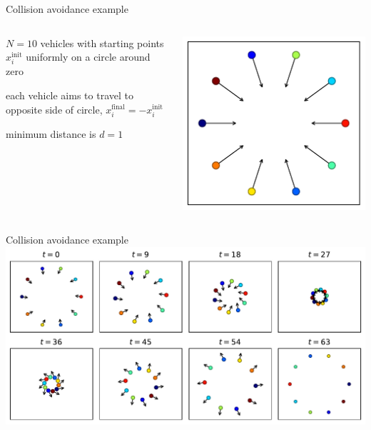 \documentclass[aspectratio=169,11pt]{beamer}
\begin{document}
\begin{frame}{Collision avoidance example}
\begin{columns}
\begin{column}{0.7\textwidth}
\BIT
\item $N = 10$ vehicles with starting points $x^\text{init}_i$ uniformly on a circle around zero
\item each vehicle aims to travel to opposite side of circle, $x^\text{final}_i = -x^\text{init}_i$
\item minimum distance is $d=1$
\EIT
\end{column}
\begin{column}{0.3\textwidth}
\includegraphics[width=\textwidth]{collision_avoidance_setting.pdf}
\end{column}
\end{columns}
\end{frame}

\begin{frame}{Collision avoidance example}
\centering
\includegraphics[width=\textwidth]{collision_avoidance_frames.pdf}
\end{frame}
\end{document}
